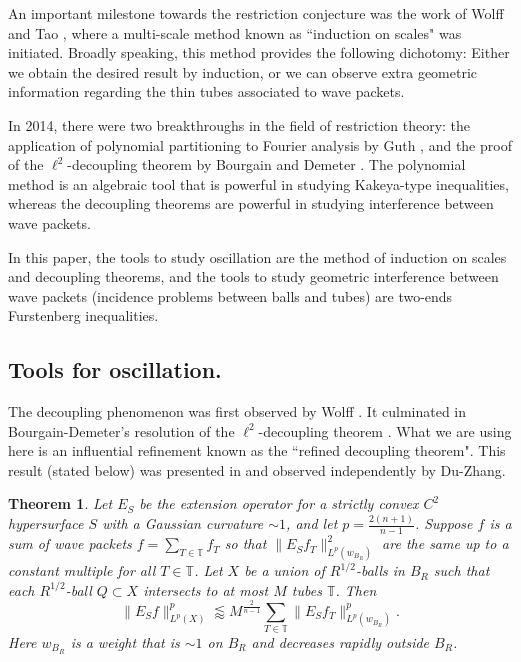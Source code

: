 \documentclass{amsart}
\numberwithin{equation}{section}
\newtheorem{theorem}{Theorem}[section]
\newcommand{\ZT}{\mathbb{T}}
\begin{document}
\smallskip

An important milestone towards the restriction conjecture was the work of Wolff \cite{Wolff-bilinear} and Tao \cite{Tao-bilinear}, where a multi-scale method known as ``induction on scales" was initiated. 
Broadly speaking, this method provides the following dichotomy: 
Either we obtain the desired result by induction, or we can observe extra geometric information regarding the thin tubes associated to wave packets. 


In 2014, there were two breakthroughs in the field of restriction theory: the application of polynomial partitioning to Fourier analysis by Guth \cite{Guth-R3}, and the proof of the $\ell^2$-decoupling theorem by Bourgain and Demeter \cite{Bourgain-Demeter-l2}. 
The polynomial method is an algebraic tool that is powerful in studying Kakeya-type inequalities, whereas the decoupling theorems are powerful in studying interference between wave packets. 

\smallskip

In this paper, the tools to study oscillation are the method of induction on scales and decoupling theorems, and the tools to study geometric interference between wave packets (incidence problems between balls and tubes) are two-ends Furstenberg inequalities. 

\medskip

\subsection{Tools for oscillation.} The decoupling phenomenon was first observed by Wolff \cite{Wolff-decoupling}. 
It culminated in Bourgain-Demeter's resolution of the $\ell^2$-decoupling theorem \cite{Bourgain-Demeter-l2}. 
What we are using here is an influential refinement known as the ``refined decoupling theorem". 
This result (stated below) was presented in \cite{GIOW} and observed independently by Du-Zhang.



\begin{theorem}
Let $E_S$ be the extension operator for a strictly convex $C^2$ hypersurface $S$ with a Gaussian curvature $\sim1$, and let $p=\frac{2(n+1)}{n-1}$. Suppose $f$ is a sum of wave packets $f=\sum_{T\in\ZT}f_T$ so that $\|E_Sf_T\|_{L^p(w_{B_R})}^2$ are  the same up to a constant multiple for all $T\in\ZT$. 
Let $X$ be a union of $R^{1/2}$-balls in $B_R$ such that each $R^{1/2}$-ball $Q\subset X$ intersects to at most $M$ tubes $\ZT$. 
Then 
\begin{equation}
    \|E_Sf\|_{L^p(X)}^p\lessapprox M^{\frac{2}{n-1}}\sum_{T\in\ZT}\|E_Sf_T\|_{L^p(w_{B_R})}^p.
\end{equation}
Here $w_{B_R}$ is a weight that is $\sim1$ on $B_R$ and decreases rapidly outside $B_R$. 
\end{theorem}
\end{document}

